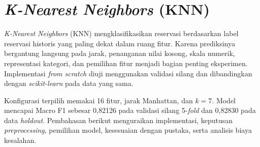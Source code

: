 \section{\textit{K-Nearest Neighbors} (KNN)}
\label{sec:knn}

\textit{K-Nearest Neighbors} (KNN) mengklasifikasikan reservasi berdasarkan label reservasi historis yang paling dekat dalam ruang fitur. Karena prediksinya bergantung langsung pada jarak, penanganan nilai kosong, skala numerik, representasi kategori, dan pemilihan fitur menjadi bagian penting eksperimen. Implementasi \textit{from scratch} diuji menggunakan validasi silang dan dibandingkan dengan \textit{scikit-learn} pada data yang sama.

Konfigurasi terpilih memakai 16 fitur, jarak Manhattan, dan $k=7$. Model mencapai Macro F1 sebesar 0,82126 pada validasi silang 5-\textit{fold} dan 0,82830 pada data \textit{holdout}. Pembahasan berikut menguraikan implementasi, keputusan \textit{preprocessing}, pemilihan model, kesesuaian dengan pustaka, serta analisis biaya kesalahan.





